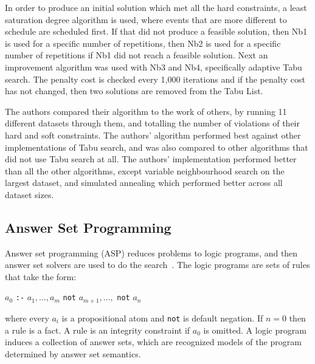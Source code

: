 \documentclass[a4paper, 12pt]{report}
\begin{document}
In order to produce an initial solution which met all the hard constraints, a
least saturation degree algorithm is used, where events that are more different
to schedule are scheduled first.
If that did not produce a feasible solution, then Nb1 is used for a specific
number of repetitions, then Nb2 is used for a specific number of repetitions if
Nb1 did not reach a feasible solution.
Next an improvement algorithm was used with Nb3 and Nb4, specifically adaptive
Tabu search.
The penalty cost is checked every 1,000 iterations and if the penalty cost has
not changed, then two solutions are removed from the Tabu List.

The authors compared their algorithm to the work of others, by running 11
different datasets through them, and totalling the number of violations of their
hard and soft constraints. 
The authors' algorithm performed best against other implementations of Tabu 
search, and was also compared to other algorithms that did not use Tabu search 
at all.
The authors' implementation performed better than all the other algorithms, 
except variable neighbourhood search on the largest dataset, and simulated 
annealing which performed better across all dataset sizes.

\subsection{Answer Set Programming}

Answer set programming (ASP) reduces problems to logic programs, and then
answer set solvers are used to do the search~\cite{asp_example}. 
The logic programs are sets of rules that take the form:
\begin{center}
	\( a_0 \) \verb|:-| \( a_1, \ldots, a_m \) \verb|not| \( a_{m+1}, \ldots, \)
	\verb|not| \( a_n \)
\end{center}
where every \( a_i \) is a propositional atom and \verb|not| is default 
negation.
If \( n = 0 \) then a rule is a fact. 
A rule is an integrity constraint if \( a_0 \) is omitted.
A logic program induces a collection of answer sets, which are recognized models
of the program determined by answer set semantics.
\end{document}
